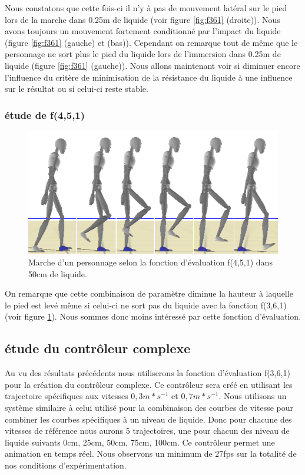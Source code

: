 \documentclass[runningheads,a4paper]{llncs}
\begin{document}
Nous constatons que cette fois-ci il n'y à pas de mouvement latéral sur le pied lors de la marche dans 0.25m de liquide (voir figure \ref{fig:f361} (droite)). Nous avons toujours un mouvement fortement conditionné par l'impact du liquide (figure \ref{fig:f361} (gauche) et (bas)). Cependant on remarque tout de même que le personnage ne sort plus le pied du liquide lors de l'immersion dans 0.25m de liquide (figure \ref{fig:f361} (gauche)). Nous allons maintenant voir si diminuer encore l'influence du critère de minimisation de la résistance du liquide à une influence sur le résultat ou si celui-ci reste stable.

\subsubsection{étude de f(4,5,1)}
\begin{figure}[h]
\centering
\includegraphics[scale=0.4]{strips/4_5_1_50cm.png}
\caption{Marche d'un personnage selon la fonction d'évaluation f(4,5,1) dans 50cm de liquide.}
\label{fig:f451}
\end{figure}

On remarque que cette combinaison de paramètre diminue la hauteur à laquelle le pied est levé même si celui-ci ne sort pas du liquide avec la fonction f(3,6,1) (voir figure \ref{fig:f451}). Nous sommes donc moins intéressé par cette fonction d'évaluation. 

\subsection{étude du contrôleur complexe}

Au vu des résultats précédents nous utiliserons la fonction d'évaluation f(3,6,1) pour la création du contrôleur complexe. Ce contrôleur sera créé en utilisant les trajectoire spécifiques aux vitesses $0,3m*s^{-1}$ et $0,7m*s^{-1}$. Nous utilisons un système similaire à celui utilisé pour la combinaison des courbes de vitesse pour combiner les courbes spécifiques à un niveau de liquide. Donc pour chacune des vitesses de référence nous aurons 5 trajectoires, une pour chacun des niveau de liquide suivants 0cm, 25cm, 50cm, 75cm, 100cm. Ce contrôleur permet une animation en temps réel. Nous observons un minimum de 27fps sur la totalité de nos conditions d'expérimentation.
\end{document}
